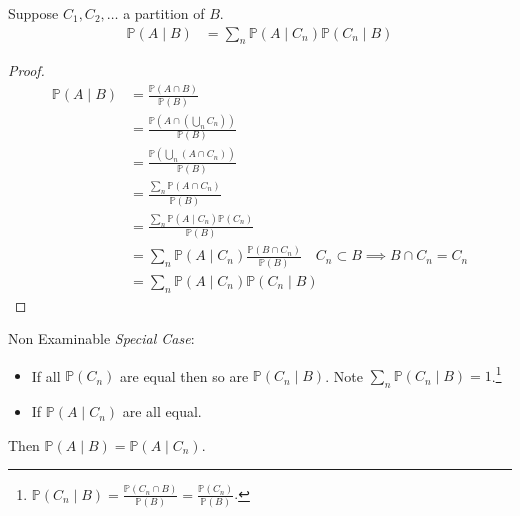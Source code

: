 \begin{theorem}
    Suppose $C_1, C_2, \dots$ a partition of $B$.
    \begin{align*}
    \mathbb{P}(A \mid B) &= \sum_n \mathbb{P}(A \mid C_n) \mathbb{P}(C_n \mid B)
    \end{align*} 
\end{theorem} 

\begin{proof}
    \begin{align*}
        \mathbb{P}(A \mid B) &= \frac{\mathbb{P}(A \cap B)}{\mathbb{P}(B)} \\
        &= \frac{\mathbb{P}\left(A \cap \left( \bigcup_n C_n \right)\right)}{\mathbb{P}(B)} \\
        &= \frac{\mathbb{P}\left( \bigcup_n (A \cap C_n) \right)}{\mathbb{P}(B)} \\
        &= \frac{\sum_n \mathbb{P}(A \cap C_n)}{\mathbb{P}(B)} \\
        &= \frac{\sum_n \mathbb{P}(A \mid C_n) \mathbb{P}(C_n)}{\mathbb{P}(B)} \\
        &= \sum_n \mathbb{P}(A \mid C_n) \frac{\mathbb{P}(B \cap C_n)}{\mathbb{P}(B)} \quad C_n \subset B \implies B \cap C_n = C_n \\
        &= \sum_n \mathbb{P}(A \mid C_n) \mathbb{P}(C_n \mid B)
    \end{align*} 
\end{proof} 

\begin{aside}{Non Examinable}
    \emph{Special Case}: 
    \begin{itemize}
        \item If all $\mathbb{P}(C_n)$ are equal then so are $\mathbb{P}(C_n \mid B)$. Note $\sum_n \mathbb{P}(C_n \mid B) = 1$.\footnote{$\mathbb{P}(C_n \mid B) = \frac{\mathbb{P}(C_n \cap B)}{\mathbb{P}(B)} = \frac{\mathbb{P}(C_n)}{\mathbb{P}(B)}$.}
        \item If $\mathbb{P}(A \mid C_n)$ are all equal.
    \end{itemize} 

    Then $\mathbb{P}(A \mid B) = \mathbb{P}(A \mid C_n)$.

\end{aside} 

